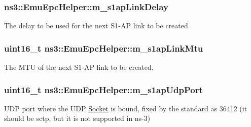 \subsubsection[{\texorpdfstring{m\+\_\+s1ap\+Link\+Delay}{m_s1apLinkDelay}}]{ ns3\+::\+Emu\+Epc\+Helper\+::m\+\_\+s1ap\+Link\+Delay\hspace{0.3cm}{\ttfamily [private]}}\hypertarget{classns3_1_1EmuEpcHelper_a9e719fe27e97da61af652e8fe47640b6}{}\label{classns3_1_1EmuEpcHelper_a9e719fe27e97da61af652e8fe47640b6}
The delay to be used for the next S1-\/\+AP link to be created 
\subsubsection[{\texorpdfstring{m\+\_\+s1ap\+Link\+Mtu}{m_s1apLinkMtu}}]{\setlength{\rightskip}{0pt plus 5cm}uint16\+\_\+t ns3\+::\+Emu\+Epc\+Helper\+::m\+\_\+s1ap\+Link\+Mtu\hspace{0.3cm}{\ttfamily [private]}}\hypertarget{classns3_1_1EmuEpcHelper_a8ed5f99d60bfe51d3dac00c2ab445a17}{}\label{classns3_1_1EmuEpcHelper_a8ed5f99d60bfe51d3dac00c2ab445a17}
The M\+TU of the next S1-\/\+AP link to be created. 
\subsubsection[{\texorpdfstring{m\+\_\+s1ap\+Udp\+Port}{m_s1apUdpPort}}]{\setlength{\rightskip}{0pt plus 5cm}uint16\+\_\+t ns3\+::\+Emu\+Epc\+Helper\+::m\+\_\+s1ap\+Udp\+Port\hspace{0.3cm}{\ttfamily [private]}}\hypertarget{classns3_1_1EmuEpcHelper_a40b9bb46dee69ea02ffe0722b462db8e}{}\label{classns3_1_1EmuEpcHelper_a40b9bb46dee69ea02ffe0722b462db8e}
U\+DP port where the U\+DP \hyperlink{classns3_1_1Socket}{Socket} is bound, fixed by the standard as 36412 (it should be sctp, but it is not supported in ns-\/3) 
